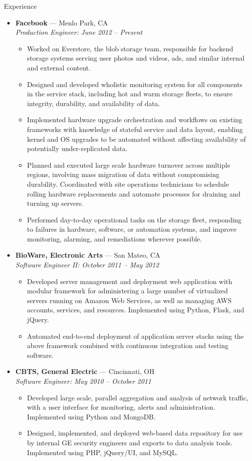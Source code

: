 \documentclass[11pt,oneside]{article}
\newenvironment{ressection}[1]{
    \vspace{8pt}
    {\fontfamily{phv}\selectfont\Large#1}
    \begin{itemize}
    \vspace{3pt}
}{
    \end{itemize}
}
\newcommand{\ressubitem}[1]{
    \vspace{-1pt}
    \item \begin{flushleft} #1 \end{flushleft}
}
\newcommand{\resbigitem}[3]{
    \vspace{-5pt}
    \item
    \textbf{#1} --- #2 \\
    \textit{#3}
}
\newenvironment{ressubsec}[3]{
    \resbigitem{#1}{#2}{#3}
    \vspace{-2pt}
    \begin{itemize}
}{
    \end{itemize}
}
\begin{document}
\begin{ressection}{Experience}

    \begin{ressubsec}{Facebook}{Menlo Park, CA}
    {Production Engineer: June 2012 -- Present}
        \ressubitem{Worked on Everstore, the blob storage team, responsible for backend
            storage systems serving user photos and videos, ads, and similar internal
            and external content.}
        \ressubitem{Designed and developed wholistic monitoring system for all components
            in the service stack, including hot and warm storage fleets, to ensure integrity,
            durability, and availability of data.}
        \ressubitem{Implemented hardware upgrade orchestration and workflows on existing
            frameworks with knowledge of stateful service and data layout, enabling kernel
            and OS upgrades to be automated without affecting availability of potentially
            under-replicated data.}
        \ressubitem{Planned and executed large scale hardware turnover across multiple
            regions, involving mass migration of data without compromising durability.
            Coordinated with site operations technicians to schedule rolling hardware
            replacements and automate processes for draining and turning up servers.}
        \ressubitem{Performed day-to-day operational tasks on the storage fleet, responding
            to failures in hardware, software, or automation systems, and improve monitoring,
            alarming, and remediations wherever possible.}
    \end{ressubsec}

    \begin{ressubsec}{BioWare, Electronic Arts}{San Mateo, CA}
    {Software Engineer II: October 2011 -- May 2012}
        \ressubitem{Developed server management and deployment web application with
        modular framework for administering a large number of virtualized servers
        running on Amazon Web Services, as well as managing AWS accounts, services, and
        resources.  Implemented using Python, Flask, and jQuery.}
        \ressubitem{Automated end-to-end deployment of application server stacks using
            the above framework combined with continuous integration and testing software.}
    \end{ressubsec}

    \begin{ressubsec}{CBTS, General Electric}{Cincinnati, OH}
    {Software Engineer: May 2010 -- October 2011}
        \ressubitem{Developed large scale, parallel aggregation and analysis of network
        traffic, with a user interface for monitoring, alerts and administration.
        Implemented using Python and MongoDB.}
        \ressubitem{Designed, implemented, and deployed web-based data repository
        for use by internal GE security engineers and exports to data analysis tools.
        Implemented using PHP, jQuery/UI, and MySQL.}
    \end{ressubsec}


\end{ressection}
\end{document}
